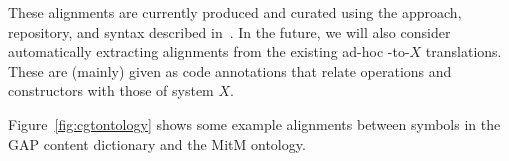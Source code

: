 These alignments are currently produced and curated using the approach, repository, and syntax described in~\cite{MueGauKal:cacfms17,MueRoYuRa:abtafs17}.
In the future, we will also consider automatically extracting alignments from the existing ad-hoc \Sage-to-$X$ translations.
These are (mainly) given as \Sage code annotations that relate \Sage operations and constructors with those of system $X$.

Figure~\ref{fig:cgtontology} shows some example alignments between symbols in the GAP content dictionary and the MitM ontology.




%





